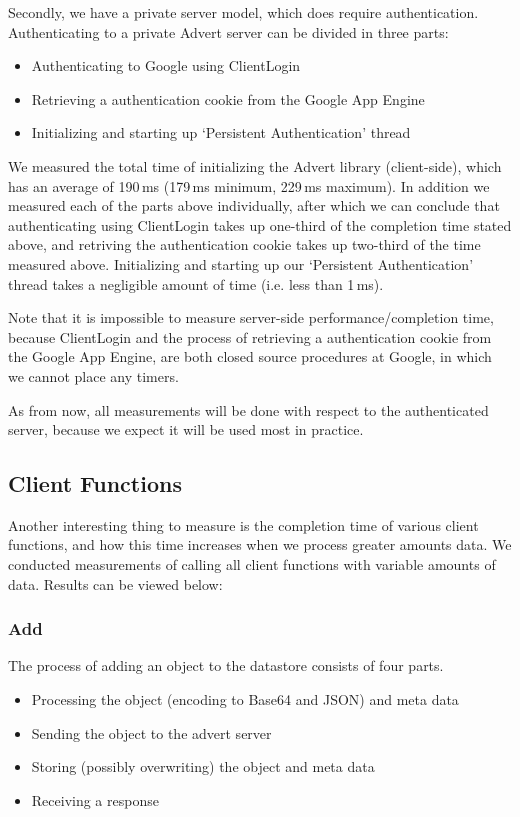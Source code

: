 Secondly, we have a private server model, which does require authentication.
Authenticating to a private Advert server can be divided in three parts:

\begin{itemize}
  \item Authenticating to Google using ClientLogin
  \item Retrieving a authentication cookie from the Google App Engine
  \item Initializing and starting up `Persistent Authentication' thread
\end{itemize}

We measured the total time of initializing the Advert library (client-side),
which has an average of 190\,ms (179\,ms minimum, 229\,ms maximum). In addition
we measured each of the parts above individually, after which we can conclude
that authenticating using ClientLogin takes up one-third of the completion time
stated above, and retriving the authentication cookie takes up two-third of the
time measured above. Initializing and starting up our `Persistent Authentication'
thread takes a negligible amount of time (i.e. less than 1\,ms).

Note that it is impossible to measure server-side performance/completion time,
because ClientLogin and the process of retrieving a authentication cookie from the
Google App Engine, are both closed source procedures at Google, in which we
cannot place any timers.

As from now, all measurements will be done with respect to the authenticated
server, because we expect it will be used most in practice.

\subsection{Client Functions}
Another interesting thing to measure is the completion time of various client
functions, and how this time increases when we process greater amounts data. We
conducted measurements of calling all client functions with variable amounts of
data. Results can be viewed below:

\subsubsection{Add}
The process of adding an object to the datastore consists of four parts.

\begin{itemize}
  \item Processing the object (encoding to Base64 and JSON) and meta data
  \item Sending the object to the advert server
  \item Storing (possibly overwriting) the object and meta data
  \item Receiving a response
\end{itemize}

